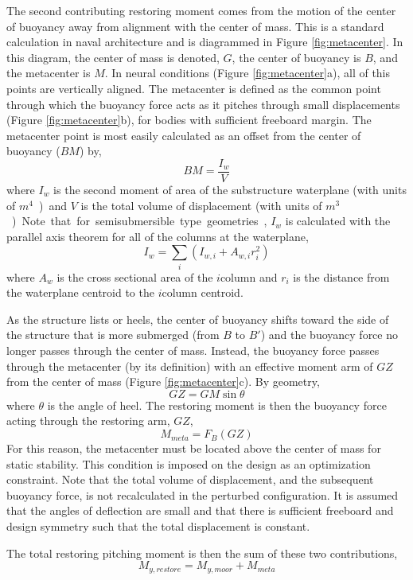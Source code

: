 The second contributing restoring moment comes from the motion of the
center of buoyancy away from alignment with the center of mass.  This is
a standard calculation in naval architecture \citep{thiagarajan2014} and is
diagrammed in Figure \ref{fig:metacenter}.  In this diagram, the center
of mass is denoted, $G$, the center of buoyancy is $B$, and the
metacenter is $M$.  In neural conditions (Figure \ref{fig:metacenter}a),
all of this points are vertically aligned.  The metacenter is defined as
the common point through which the buoyancy force acts as it pitches
through small displacements (Figure \ref{fig:metacenter}b), for bodies
with sufficient freeboard margin.  The metacenter point is most easily
calculated as an offset from the center of buoyancy ($BM$) by,
\[
  BM = \frac{I_w}{V}
\]
where $I_w$ is the second moment of area of the substructure waterplane
(with units of \unit{$m^4$}) and $V$ is the total volume of displacement
(with units of \unit{$m^3$}).  Note that for semisubmersible type
geometries, $I_w$ is calculated with the parallel axis theorem for all
of the columns at the waterplane,
\[
  I_w = \sum_i \left( I_{w,i} + A_{w,i}r_i^2 \right)
\]
where $A_w$ is the cross sectional area of the $i$\th column and $r_i$
is the distance from the waterplane centroid to the $i$\th column centroid.

As the structure lists or heels, the center of buoyancy shifts toward
the side of the structure that is more submerged (from $B$ to $B'$) and
the buoyancy force no longer passes through the center of mass.
Instead, the buoyancy force passes through the metacenter (by its
definition) with an effective moment arm of $GZ$ from the center of mass
(Figure \ref{fig:metacenter}c).  By geometry,
\[
GZ = GM \sin \theta
\]
where $\theta$ is the angle of heel.  The restoring moment is then the
buoyancy force acting through the restoring arm, $GZ$,
\[
  M_{meta} = F_B \left(GZ\right)
\]
For this reason, the metacenter must be located above the center of mass
for static stability.  This condition is imposed on the design as an
optimization constraint.  Note that the total volume of displacement,
and the subsequent buoyancy force, is not recalculated in the perturbed
configuration.  It is assumed that the angles of deflection are small
and that there is sufficient freeboard and design symmetry such that the
total displacement is constant.

The total restoring pitching moment is then the sum of these two
contributions,
\[
  M_{y,restore} = M_{y,moor} + M_{meta}
\]

